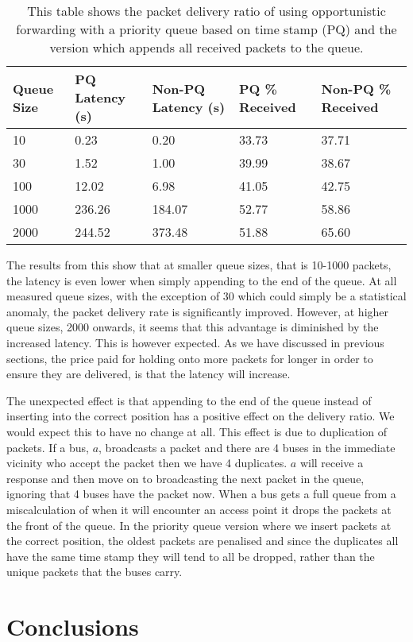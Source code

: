         \begin{table}
            \begin{tabularx}{\linewidth}{|X|X|X|X|X|}
                \hline
                \multicolumn{1}{|X|}{\centering Queue Size} & 
                \multicolumn{1}{|X|}{\centering PQ Latency (s)} & 
                \multicolumn{1}{|X|}{\centering Non-PQ Latency (s)} & 
                \multicolumn{1}{|X|}{\centering PQ \% Received} & 
                \multicolumn{1}{|X|}{\centering Non-PQ \% Received} \\
                \hline
                10 & 0.23 & 0.20 & 33.73 & 37.71 \\
                30 & 1.52 & 1.00 & 39.99 & 38.67 \\
                100 & 12.02 & 6.98 & 41.05 & 42.75 \\
                1000 & 236.26 & 184.07 & 52.77 & 58.86 \\
                2000 & 244.52 & 373.48 & 51.88 & 65.60 \\
                \hline
            \end{tabularx}
            \caption{This table shows the packet delivery ratio of using opportunistic forwarding with a priority queue based on time stamp (PQ) and the version which appends all received packets to the queue.}
            \label{tab:priority_queue}
        \end{table}

        \missingfigure{}

        The results from this show that at smaller queue sizes, that is 10-1000 packets, the latency is even lower when simply appending to the end of the queue. At all measured queue sizes, with the exception of 30 which could simply be a statistical anomaly, the packet delivery rate is significantly improved. However, at higher queue sizes, 2000 onwards, it seems that this advantage is diminished by the increased latency. This is however expected. As we have discussed in previous sections, the price paid for holding onto more packets for longer in order to ensure they are delivered, is that the latency will increase. 

        The unexpected effect is that appending to the end of the queue instead of inserting into the correct position has a positive effect on the delivery ratio. We would expect this to have no change at all. This effect is due to duplication of packets. If a bus, $a$, broadcasts a packet and there are 4 buses in the immediate vicinity who accept the packet then we have 4 duplicates. $a$ will receive a response and then move on to broadcasting the next packet in the queue, ignoring that 4 buses have the packet now. When a bus gets a full queue from a miscalculation of when it will encounter an access point it drops the packets at the front of the queue. In the priority queue version where we insert packets at the correct position, the oldest packets are penalised and since the duplicates all have the same time stamp they will tend to all be dropped, rather than the unique packets that the buses carry. 

        

    \section{Conclusions}\label{data_gathering_performance_conclusions}

        
